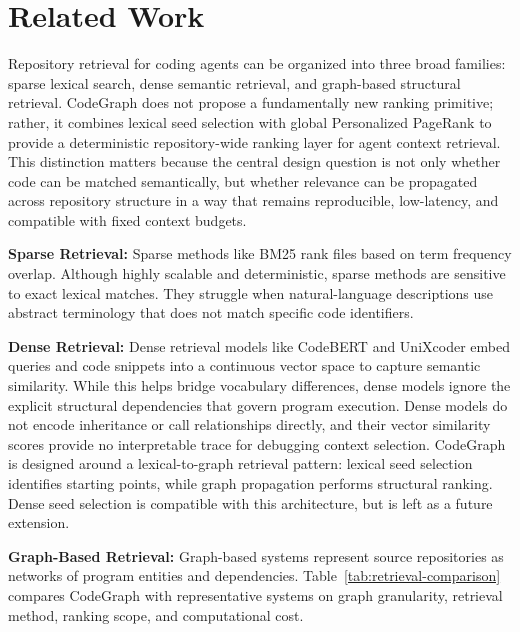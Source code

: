 \section{Related Work}
\label{sec:related_work}

Repository retrieval for coding agents can be organized into three broad families: sparse lexical search, dense semantic retrieval, and graph-based structural retrieval. CodeGraph does not propose a fundamentally new ranking primitive; rather, it combines lexical seed selection with global Personalized PageRank to provide a deterministic repository-wide ranking layer for agent context retrieval. This distinction matters because the central design question is not only whether code can be matched semantically, but whether relevance can be propagated across repository structure in a way that remains reproducible, low-latency, and compatible with fixed context budgets.

\textbf{Sparse Retrieval:} Sparse methods like BM25 \cite{bm25} rank files based on term frequency overlap. Although highly scalable and deterministic, sparse methods are sensitive to exact lexical matches. They struggle when natural-language descriptions use abstract terminology that does not match specific code identifiers.

\textbf{Dense Retrieval:} Dense retrieval models like CodeBERT \cite{codebert} and UniXcoder \cite{unixcoder} embed queries and code snippets into a continuous vector space to capture semantic similarity. While this helps bridge vocabulary differences, dense models ignore the explicit structural dependencies that govern program execution. Dense models do not encode inheritance or call relationships directly, and their vector similarity scores provide no interpretable trace for debugging context selection. CodeGraph is designed around a lexical-to-graph retrieval pattern: lexical seed selection identifies starting points, while graph propagation performs structural ranking. Dense seed selection is compatible with this architecture, but is left as a future extension.

\textbf{Graph-Based Retrieval:} Graph-based systems represent source repositories as networks of program entities and dependencies. Table~\ref{tab:retrieval-comparison} compares CodeGraph with representative systems on graph granularity, retrieval method, ranking scope, and computational cost.

